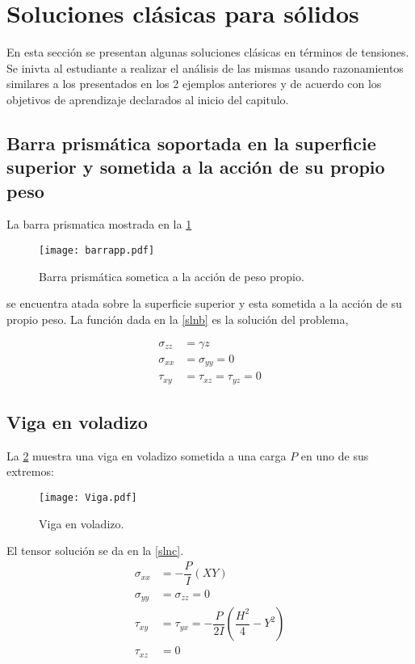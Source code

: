 \documentclass[../notas medios.tex]{subfiles}
\begin{document}
\section{Soluciones clásicas para sólidos}
En esta sección se presentan algunas soluciones clásicas en términos de tensiones. Se inivta al estudiante a realizar el análisis de las mismas usando razonamientos similares a los presentados en los 2 ejemplos anteriores y de acuerdo con los objetivos de aprendizaje declarados al inicio del capitulo.

\subsection{Barra prismática soportada en la superficie superior y sometida a la acción de su propio peso}

La barra prismatica mostrada en la \cref{barra}

\begin{figure}[H]
\centering
	\texttt{[image: barrapp.pdf]}
	\caption{Barra prismática sometica a la acción de peso propio.}
	\label{barra}
\end{figure}

se encuentra atada sobre la superficie superior y esta sometida a la acción de su propio peso. La función dada en la \cref{slnb} es la solución del problema,


\begin{equation}
\begin{split}
{\sigma _{zz}} & = \gamma z \\
{\sigma _{xx}} & = {\sigma _{yy}} = 0 \\
{\tau _{xy}}   & = {\tau _{xz}} = {\tau _{yz}} = 0
\end{split}
\label{slnb}
\end{equation}


\subsection{Viga en voladizo}

La \cref{Viga} muestra una viga en voladizo sometida a una carga $P$ en uno de sus extremos: 
\begin{figure}[H]
\centering
	\texttt{[image: Viga.pdf]}
	\caption{Viga en voladizo.}
	\label{Viga}
\end{figure}

El tensor solución se da en la \cref{slnc}.
\begin{equation}
\begin{split}
{\sigma_{xx}} & = - \dfrac{P}{I} (XY) \\
 {\sigma_{yy} }&= \sigma_{zz} = 0 \\
{\tau_{xy}} & = \tau_{yx} = - \dfrac{P}{2I} (\dfrac{H^2}{4} - Y^2) \\ 
{\tau_{xz}} &= 0
\end{split}	
\label{viga}
\end{equation}
\end{document}
